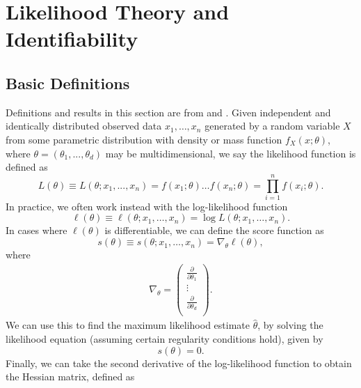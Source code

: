 \documentclass[11pt,a4,twosided,singlespacing,titlepagenumber=on,numbers=endperiod]{scrreprt}
\numberwithin{equation}{chapter} %
\theoremstyle{remark}
\begin{document}
\chapter{Likelihood Theory and Identifiability}

\section{Basic Definitions}
Definitions and results in this section are from \cite{fisher_1922} and \cite{young_smith_2005}. Given independent and identically distributed observed data $x_1, \dots, x_n$ generated by a random variable $X$ from some parametric distribution with density or mass function $f_X(x; \theta)$, where $\theta = (\theta_1, ..., \theta_d)$ may be multidimensional, we say the likelihood function is defined as
\begin{equation}\label{eq:likelihood}
	L(\theta) \equiv L(\theta; x_1, ..., x_n) = f(x_1; \theta) \dots f(x_n; \theta) = \prod_{i=1}^n f(x_i; \theta).
\end{equation}
In practice, we often work instead with the log-likelihood function
\begin{equation}\label{eq:log_likelihood}
	\ell(\theta) \equiv \ell(\theta; x_1, \dots, x_n) = \log L(\theta; x_1, \dots, x_n).
\end{equation}
In cases where $\ell(\theta)$ is differentiable, we can define the score function as
\begin{equation}\label{eq:score}
	s(\theta) \equiv s(\theta; x_1, \dots, x_n) = \nabla_\theta \ell(\theta),
\end{equation}
where
\begin{equation*}
	\begin{aligned}
		\nabla_\theta = 
		\begin{pmatrix}
			\frac{\partial}{\partial \theta_1}\\[1ex]
			\vdots\\[1ex]
			\frac{\partial}{\partial \theta_d}\\
		\end{pmatrix}.
	\end{aligned}
\end{equation*}
We can use this to find the maximum likelihood estimate $\hat{\theta}$, by solving the likelihood equation (assuming certain regularity conditions hold), given by
\begin{equation*}
	s(\theta) = 0.
\end{equation*}
Finally, we can take the second derivative of the log-likelihood function to obtain the Hessian matrix, defined as
\end{document}
